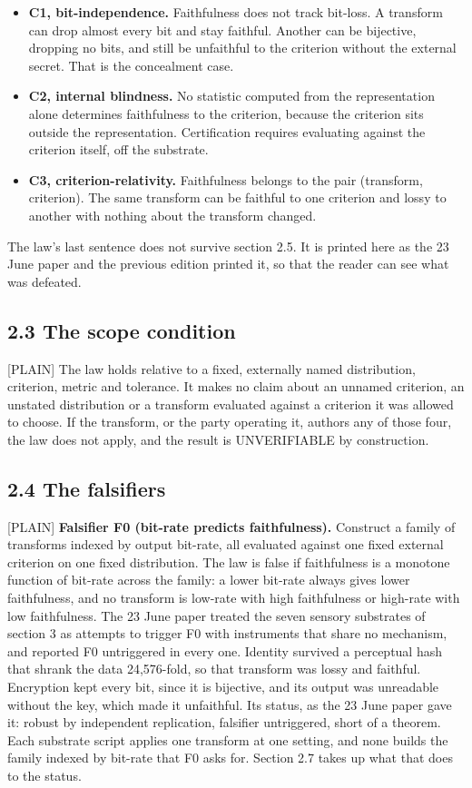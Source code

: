 \documentclass[11pt]{article}
\newcommand{\register}[1]{{\ttfamily\small #1}}
\begin{document}
\begin{itemize}
\item \textbf{C1, bit-independence.} Faithfulness does not track bit-loss. A transform can drop almost every bit and stay faithful. Another can be bijective, dropping no bits, and still be unfaithful to the criterion without the external secret. That is the concealment case.
\item \textbf{C2, internal blindness.} No statistic computed from the representation alone determines faithfulness to the criterion, because the criterion sits outside the representation. Certification requires evaluating against the criterion itself, off the substrate.
\item \textbf{C3, criterion-relativity.} Faithfulness belongs to the pair (transform, criterion). The same transform can be faithful to one criterion and lossy to another with nothing about the transform changed.
\end{itemize}
The law's last sentence does not survive section 2.5. It is printed here as the 23 June paper and the previous edition printed it, so that the reader can see what was defeated.

\subsection*{2.3 The scope condition}

\register{[PLAIN]} The law holds relative to a fixed, externally named distribution, criterion, metric and tolerance. It makes no claim about an unnamed criterion, an unstated distribution or a transform evaluated against a criterion it was allowed to choose. If the transform, or the party operating it, authors any of those four, the law does not apply, and the result is UNVERIFIABLE by construction.

\subsection*{2.4 The falsifiers}

\register{[PLAIN]} \textbf{Falsifier F0 (bit-rate predicts faithfulness).} Construct a family of transforms indexed by output bit-rate, all evaluated against one fixed external criterion on one fixed distribution. The law is false if faithfulness is a monotone function of bit-rate across the family: a lower bit-rate always gives lower faithfulness, and no transform is low-rate with high faithfulness or high-rate with low faithfulness. The 23 June paper treated the seven sensory substrates of section 3 as attempts to trigger F0 with instruments that share no mechanism, and reported F0 untriggered in every one. Identity survived a perceptual hash that shrank the data 24,576-fold, so that transform was lossy and faithful. Encryption kept every bit, since it is bijective, and its output was unreadable without the key, which made it unfaithful. Its status, as the 23 June paper gave it: robust by independent replication, falsifier untriggered, short of a theorem. Each substrate script applies one transform at one setting, and none builds the family indexed by bit-rate that F0 asks for. Section 2.7 takes up what that does to the status.
\end{document}
